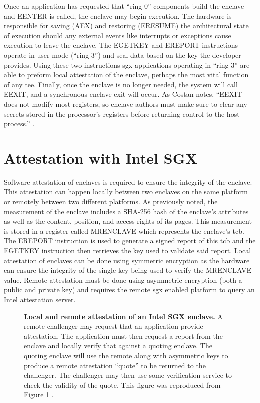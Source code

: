 Once an application has requested that ``\gls{ring} 0'' components build the enclave and EENTER is called, the enclave may begin execution. The hardware is responsible for saving (AEX) and restoring (ERESUME) the architectural state of execution should any external events like interrupts or exceptions cause execution to leave the enclave. The EGETKEY and EREPORT instructions operate in user mode (``\gls{ring} 3'') and seal data based on the key the developer provides. Using these two instructions \gls{sgx} applications operating in ``\gls{ring} 3'' are able to preform local \gls{attestation} of the enclave, perhaps the most vital function of any \gls{tee}. Finally, once the enclave is no longer needed, the system will call EEXIT, and a synchronous enclave exit will occur. As Costan notes, ``EEXIT does not modify most registers, so enclave authors must make sure to clear any secrets stored in the processor’s registers before returning control to the host process.'' \cite{Costan2016}.

\section{Attestation with Intel SGX}
Software \gls{attestation} of enclaves is required to ensure the integrity of the enclave. This \gls{attestation} can happen locally between two enclaves on the same platform or remotely between two different platforms. As previously noted, the \gls{measurement} of the enclave includes a SHA-256 hash of the enclave's attributes as well as the content, position, and access rights of its pages. This \gls{measurement} is stored in a register called MRENCLAVE which represents the enclave's \gls{tcb}. The EREPORT instruction is used to generate a signed report of this \gls{tcb} and the EGETKEY instruction then retrieves the key used to validate said report. Local \gls{attestation} of enclaves can be done using symmetric encryption as the hardware can ensure the integrity of the single key being used to verify the MRENCLAVE value. Remote \gls{attestation} must be done using asymmetric encryption (both a public and private key) and requires the remote \gls{sgx} enabled platform to query an Intel \gls{attestation} server.

\begin{figure}[ht]
\centering

\caption[Intel SGX Attestation]{\textbf{Local and remote attestation of an Intel SGX enclave.} A remote challenger may request that an application provide \gls{attestation}. The application must then request a report from the enclave and locally verify that against a quoting enclave. The quoting enclave will use the remote along with asymmetric keys to produce a remote \gls{attestation} ``quote'' to be returned to the challenger. The challenger may then use some verification service to check the validity of the quote. This figure was reproduced from Figure 1 \cite{johnson2016intel}.}
\label{fig:sgx-attest}
\end{figure}


